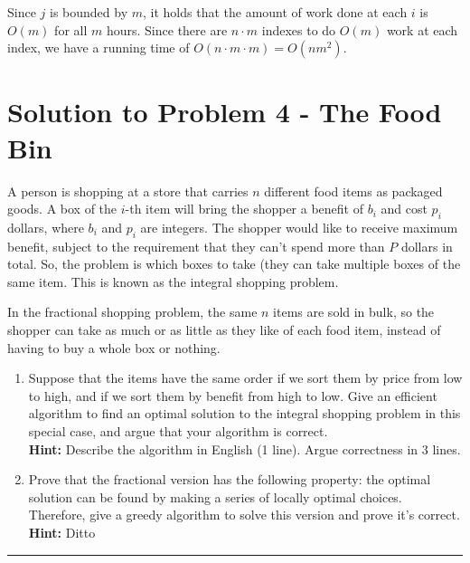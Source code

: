 \documentclass[11pt]{article}
\begin{document}
Since $j$ is bounded by $m$, it holds that the amount of work done at each $i$ is $O(m)$ for all $m$ hours. Since there are $n \cdot m$ indexes to do $O(m)$ work at each index, we have a running time of $O(n \cdot m \cdot m) = O(nm^2)$. 

\pagebreak

\section*{Solution to Problem 4 - The Food Bin}

A person is shopping at a store that carries $n$ different food items as packaged goods. A box of the $i$-th item will bring the shopper a benefit of $b_i$ and cost $p_i$ dollars, where $b_i$ and $p_i$ are integers. The shopper would like to receive maximum benefit, subject to the requirement that they can't spend more than $P$ dollars in total. So, the problem is which boxes to take (they can take multiple boxes of the same item. This is known as the integral shopping problem.

In the fractional shopping problem, the same $n$ items are sold in bulk, so the shopper can take as much or as little as they like of each food item, instead of having to buy a whole box or nothing.

\begin{enumerate}
\item Suppose that the items have the same order if we sort them by price from low to high, and if we sort them by benefit from high to low. Give an efficient algorithm to find an optimal solution to the integral shopping problem in this special case, and argue that your algorithm is correct.\\
\textbf{Hint:} Describe the algorithm in English (1 line). Argue correctness in 3 lines.
\item Prove that the fractional version has the following property: the optimal solution can be found by making a series of locally optimal choices. Therefore, give a greedy algorithm to solve this version and prove it's correct.\\
\textbf{Hint:} Ditto
\end{enumerate}
\noindent\rule{17cm}{0.4pt}
\end{document}
